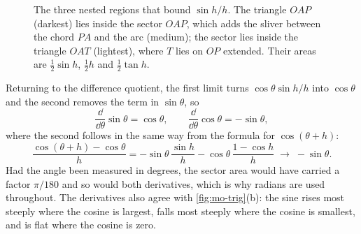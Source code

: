 \begin{figure}[htb]
\centering
{}
\caption{The three nested regions that bound $\sin h/h$. The triangle
$OAP$ (darkest) lies inside the sector $OAP$, which adds the sliver
between the chord $PA$ and the arc (medium); the sector lies inside the
triangle $OAT$ (lightest), where $T$ lies on $OP$ extended. Their areas
are $\tfrac12\sin h$, $\tfrac12 h$ and $\tfrac12\tan h$.}
\label{fig:mo-squeeze}
\end{figure}

Returning to the difference quotient, the first limit turns $\cos\theta
\sin h/h$ into $\cos\theta$ and the second removes the term in $\sin
\theta$, so
\begin{equation}
   \frac{\dd}{\dd\theta}\sin\theta = \cos\theta, \qquad
   \frac{\dd}{\dd\theta}\cos\theta = -\sin\theta ,
   \label{eq:mo-trig-derivs}
\end{equation}
where the second follows in the same way from the formula for
$\cos(\theta + h)$:
\begin{equation*}
   \frac{\cos(\theta+h) - \cos\theta}{h}
   = -\sin\theta\,\frac{\sin h}{h} - \cos\theta\,\frac{1 - \cos h}{h}
   \;\longrightarrow\; -\sin\theta .
\end{equation*}
Had the angle been measured in degrees, the sector area would have
carried a factor $\pi/180$ and so would both derivatives, which is why
radians are used throughout. The derivatives also agree with
\cref{fig:mo-trig}(b): the sine rises most steeply where the cosine is
largest, falls most steeply where the cosine is smallest, and is flat
where the cosine is zero.

